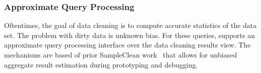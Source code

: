 \subsubsection{Approximate Query Processing}
Oftentimes, the goal of data cleaning is to compute accurate 
statistics of the data set.  The problem with dirty data is unknown bias.
For these queries, \sys supports an approximate query processing interface 
over the data cleaning results view.  The mechanisms are based of prior
SampleClean work~\cite{sampleclean} that allows for unbiased aggregate result estimation during prototyping and debugging.



